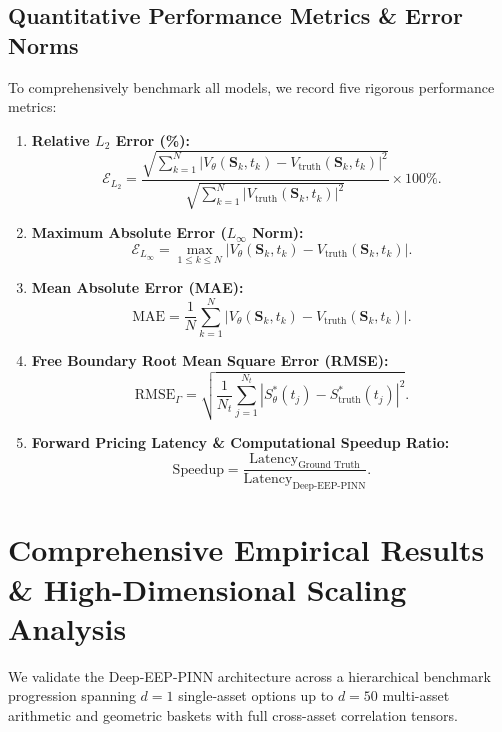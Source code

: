 \documentclass[11pt,a4paper]{article}
\begin{document}
\subsection{Quantitative Performance Metrics \& Error Norms}
To comprehensively benchmark all models, we record five rigorous performance metrics:
\begin{enumerate}[label=(\roman*)]
    \item \textbf{Relative $L_2$ Error (\%):}
    \begin{equation}
    \mathcal{E}_{L_2} = \frac{\sqrt{\sum_{k=1}^N |V_\theta(\mathbf{S}_k, t_k) - V_{\text{truth}}(\mathbf{S}_k, t_k)|^2}}{\sqrt{\sum_{k=1}^N |V_{\text{truth}}(\mathbf{S}_k, t_k)|^2}} \times 100\%.
    \end{equation}
    \item \textbf{Maximum Absolute Error ($L_\infty$ Norm):}
    \begin{equation}
    \mathcal{E}_{L_\infty} = \max_{1 \le k \le N} \left| V_\theta(\mathbf{S}_k, t_k) - V_{\text{truth}}(\mathbf{S}_k, t_k) \right|.
    \end{equation}
    \item \textbf{Mean Absolute Error (MAE):}
    \begin{equation}
    \text{MAE} = \frac{1}{N} \sum_{k=1}^N \left| V_\theta(\mathbf{S}_k, t_k) - V_{\text{truth}}(\mathbf{S}_k, t_k) \right|.
    \end{equation}
    \item \textbf{Free Boundary Root Mean Square Error (RMSE):}
    \begin{equation}
    \text{RMSE}_{\Gamma} = \sqrt{ \frac{1}{N_t} \sum_{j=1}^{N_t} \left| S^*_\theta(t_j) - S^*_{\text{truth}}(t_j) \right|^2 }.
    \end{equation}
    \item \textbf{Forward Pricing Latency \& Computational Speedup Ratio:}
    \begin{equation}
    \text{Speedup} = \frac{\text{Latency}_{\text{Ground Truth}}}{\text{Latency}_{\text{Deep-EEP-PINN}}}.
    \end{equation}
\end{enumerate}

\section{Comprehensive Empirical Results \& High-Dimensional Scaling Analysis}

We validate the Deep-EEP-PINN architecture across a hierarchical benchmark progression spanning $d=1$ single-asset options up to $d=50$ multi-asset arithmetic and geometric baskets with full cross-asset correlation tensors.
\end{document}
